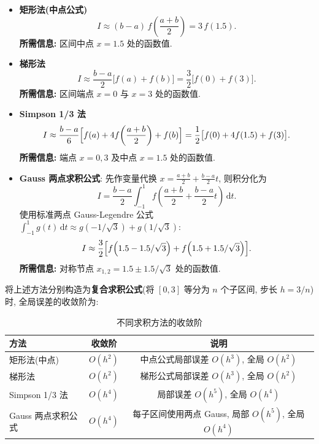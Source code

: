 \documentclass[zihao=-4,a4paper]{ctexart}
\begin{document}
\begin{itemize}
    \item \textbf{矩形法(中点公式)}
    \[
    I \approx (b-a)\,f\!\left(\frac{a+b}{2}\right) = 3\,f(1.5).
    \]
    \textbf{所需信息: } 区间中点 $x=1.5$ 处的函数值. 

    \item \textbf{梯形法}
    \[
    I \approx \frac{b-a}{2}\bigl[f(a)+f(b)\bigr] = \frac{3}{2}\bigl[f(0)+f(3)\bigr].
    \]
    \textbf{所需信息: } 区间端点 $x=0$ 与 $x=3$ 处的函数值. 

    \item \textbf{Simpson 1/3 法}
    \[
    I \approx \frac{b-a}{6}\Bigl[f(a)+4f\!\left(\frac{a+b}{2}\right)+f(b)\Bigr] = \frac{1}{2}\bigl[f(0)+4f(1.5)+f(3)\bigr].
    \]
    \textbf{所需信息: } 端点 $x=0,3$ 及中点 $x=1.5$ 处的函数值. 

    \item \textbf{Gauss 两点求积公式}: 先作变量代换 $x = \frac{a+b}{2} + \frac{b-a}{2}t$, 则积分化为
    \[
    I = \frac{b-a}{2}\int_{-1}^1 f\!\left(\frac{a+b}{2}+\frac{b-a}{2}t\right)\,\mathrm{d}t.
    \]
    使用标准两点 Gauss-Legendre 公式 $\int_{-1}^1 g(t)\,\mathrm{d}t \approx g(-1/\sqrt{3}) + g(1/\sqrt{3})$: 
    \[
    I \approx \frac{3}{2}\Bigl[f\!\left(1.5 - 1.5/\sqrt{3}\right) + f\!\left(1.5 + 1.5/\sqrt{3}\right)\Bigr].
    \]
    \textbf{所需信息: } 对称节点 $x_{1,2} = 1.5 \pm 1.5/\sqrt{3}$ 处的函数值. 
\end{itemize}


将上述方法分别构造为\textbf{复合求积公式}(将 $[0,3]$ 等分为 $n$ 个子区间, 步长 $h = 3/n$)时, 全局误差的收敛阶为: 

\begin{table}[H]
\centering
\caption{不同求积方法的收敛阶}
    \begin{tabular}{lcc}
    \toprule
        方法               & 收敛阶   & 说明                                  \\
        \midrule
        矩形法(中点)     & $O(h^2)$ & 中点公式局部误差 $O(h^3)$, 全局 $O(h^2)$ \\
        梯形法             & $O(h^2)$ & 梯形公式局部误差 $O(h^3)$, 全局 $O(h^2)$ \\
        Simpson 1/3 法     & $O(h^4)$ & 局部误差 $O(h^5)$, 全局 $O(h^4)$       \\
        Gauss 两点求积公式 & $O(h^4)$ & 每子区间使用两点 Gauss, 局部 $O(h^5)$, 全局 $O(h^4)$ \\
        \bottomrule
    \end{tabular}
\end{table}
\end{document}
